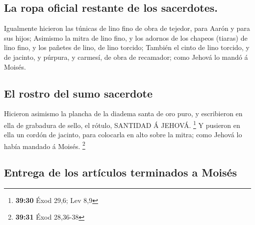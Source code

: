 \hypertarget{la-ropa-oficial-restante-de-los-sacerdotes.}{%
\subsection{La ropa oficial restante de los
sacerdotes.}\label{la-ropa-oficial-restante-de-los-sacerdotes.}}

 Igualmente hicieron las túnicas de lino fino de obra de
tejedor, para Aarón y para sus hijos;  Asimismo la mitra de
lino fino, y los adornos de los chapeos (tiaras) de lino fino, y los
pañetes de lino, de lino torcido;  También el cinto de lino
torcido, y de jacinto, y púrpura, y carmesí, de obra de recamador; como
Jehová lo mandó á Moisés.

\hypertarget{el-rostro-del-sumo-sacerdote}{%
\subsection{El rostro del sumo
sacerdote}\label{el-rostro-del-sumo-sacerdote}}

 Hicieron asimismo la plancha de la diadema santa de oro
puro, y escribieron en ella de grabadura de sello, el rótulo, SANTIDAD Á
JEHOVÁ. \footnote{\textbf{39:30} Éxod 29,6; Lev 8,9}  Y
pusieron en ella un cordón de jacinto, para colocarla en alto sobre la
mitra; como Jehová lo había mandado á Moisés. \footnote{\textbf{39:31}
  Éxod 28,36-38}

\hypertarget{entrega-de-los-artuxedculos-terminados-a-moisuxe9s}{%
\subsection{Entrega de los artículos terminados a
Moisés}\label{entrega-de-los-artuxedculos-terminados-a-moisuxe9s}}

